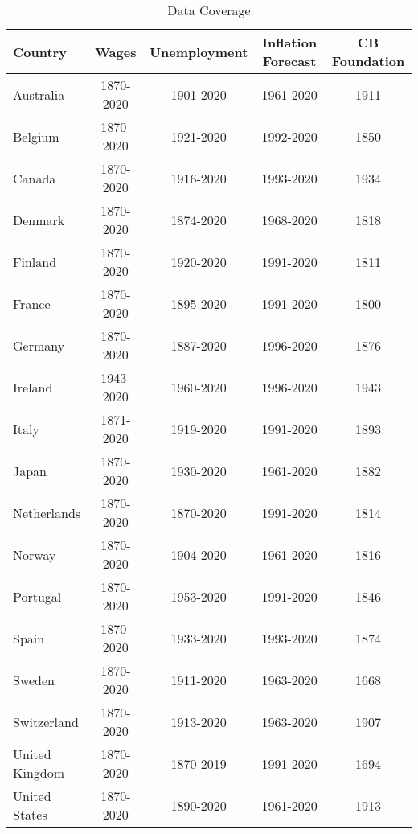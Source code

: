 \begin{table}[ht]
\caption{Data Coverage}
\label{T_DataCoverage}
\centering
\def\sym#1{\ifmmode^{#1}\else\(^{#1}\)\fi}
\begin{tabular}{l*{4}{c}}
\hline\hline
\textbf{Country}    & \textbf{Wages}  & \textbf{Unemployment} & \textbf{Inflation Forecast} & \textbf{CB Foundation} \\
\hline
Australia       & 1870-2020 & 1901-2020 & 1961-2020 & 1911\\
Belgium         & 1870-2020 & 1921-2020 & 1992-2020 & 1850\\
Canada          & 1870-2020 & 1916-2020 & 1993-2020 & 1934\\
Denmark         & 1870-2020 & 1874-2020 & 1968-2020 & 1818\\
Finland         & 1870-2020 & 1920-2020 & 1991-2020 & 1811\\
France          & 1870-2020 & 1895-2020 & 1991-2020 & 1800\\
Germany         & 1870-2020 & 1887-2020 & 1996-2020 & 1876\\
Ireland			& 1943-2020 & 1960-2020 & 1996-2020 & 1943\\
Italy           & 1871-2020 & 1919-2020 & 1991-2020 & 1893\\
Japan           & 1870-2020 & 1930-2020 & 1961-2020 & 1882\\
Netherlands     & 1870-2020 & 1870-2020 & 1991-2020 & 1814\\
Norway          & 1870-2020 & 1904-2020 & 1961-2020 & 1816\\
Portugal        & 1870-2020 & 1953-2020 & 1991-2020 & 1846\\
Spain           & 1870-2020 & 1933-2020 & 1993-2020 & 1874\\
Sweden          & 1870-2020 & 1911-2020 & 1963-2020 & 1668\\
Switzerland     & 1870-2020 & 1913-2020 & 1963-2020 & 1907\\
United Kingdom  & 1870-2020 & 1870-2019 & 1991-2020 & 1694\\
United States   & 1870-2020 & 1890-2020 & 1961-2020 & 1913\\
\hline\hline
\end{tabular}
\end{table}